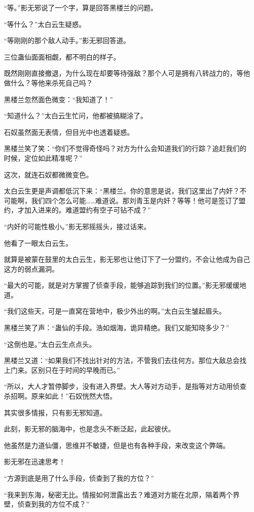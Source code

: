 \begin{this_body}
“等。”影无邪说了一个字，算是回答黑楼兰的问题。

“等什么？”太白云生疑惑。

“等刚刚的那个敌人动手。”影无邪回答道。

三位蛊仙面面相觑，都不明白的样子。

既然刚刚直接撤退，为什么现在却要等待强敌？那个人可是拥有八转战力的，等他做什么？等他来杀死自己吗？

黑楼兰忽然面色微变：“我知道了！”

“知道什么？”太白云生忙问，他都被搞糊涂了。

石奴虽然面无表情，但目光中也透着疑惑。

黑楼兰笑了笑：“你们不觉得奇怪吗？对方为什么会知道我们的行踪？追赶我们的时候，定位如此精准呢？”

这次，就连石奴都微微变色。

太白云生更是声调都低沉下来：“黑楼兰。你的意思是说，我们这里出了内奸？不可能啊，我们四个怎么可能……难道说。那刘青玉是内奸？等等！他可是签订了盟约，才加入进来的。难道盟约有空子可钻不成？”

“内奸的可能性极小。”影无邪摇摇头，接过话来。

他看了一眼太白云生。

就算是被蒙在鼓里的太白云生，影无邪也让他订下了一分盟约，不会让他成为自己这方的弱点漏洞。

“最大的可能，就是对方掌握了侦查手段，能够追踪到我们的位置。”影无邪缓缓地道。

“我们这些天，可是一直窝在营地中，极少外出的啊。”太白云生皱起眉头。

黑楼兰笑了声：“蛊仙的手段。浩如烟海，诡异精绝。我们又能知晓多少？”

“这倒也是。”太白云生点点头。

黑楼兰又道：“如果我们不找出针对的方法，不管我们去往何方。那位大敌总会找上门来。区别只在于时间的早晚而已。”

“所以，大人才暂停脚步，没有进入界壁。大人等对方动手，是指等对方动用侦查杀招啊。原来如此！”石奴恍然大悟。

其实很多情报，只有影无邪知道。

此刻，影无邪的脑海中，也是念头不断泛起，此起彼伏。

他虽然是力道仙僵，思维并不敏捷，但是也有各种手段，来改变这个弊端。

影无邪在迅速思考！

“方源到底是用了什么手段，侦查到了我的方位？”

“我来到东海，秘密无比。情报如何泄露出去？难道对方能在北原，隔着两个界壁，侦查到我的方位不成？”


\end{this_body}

